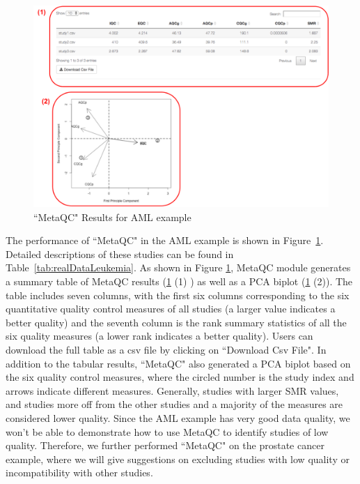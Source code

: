 \begin{figure}[H]
\begin{center}
\includegraphics[scale=0.65]{./figure/metaQC/metaQCresult_AML.pdf}
\caption{``MetaQC" Results for AML example}
\label{fig:MetaQCresult_AML}
\end{center}
\end{figure}


The performance of ``MetaQC" in the AML example is shown in Figure~\ref{fig:MetaQCresult_AML}.
Detailed descriptions of these studies can be found in Table~\ref{tab:realDataLeukemia}. 
As shown in Figure \ref{fig:MetaQCresult_AML}, 
MetaQC module generates a summary table of MetaQC results (\ref{fig:MetaQCresult_AML} {\color{red} (1)} ) 
as well as a PCA biplot (\ref{fig:MetaQCresult_AML} {\color{red} (2)}). 
The table includes seven columns, 
with the first six columns corresponding to the six quantitative quality control measures of all studies (a larger value indicates a better quality) and the seventh column is the rank summary statistics of all the six quality measures (a lower rank indicates a better quality). 
Users can download the full table as a csv file by clicking on ``Download Csv File". 
In addition to the tabular results, ``MetaQC" also generated a PCA biplot based on the six quality control measures, where the circled number is the study index and arrows indicate different measures. 
Generally, studies with larger SMR values, and studies more off from the other studies and a majority of the measures are considered lower quality.
Since the AML example has very good data quality,
we won't be able to demonstrate how to use MetaQC to identify studies of low quality.
Therefore, we further performed ``MetaQC" on the prostate cancer example, where we will give suggestions on excluding studies with low quality or incompatibility with other studies. 

